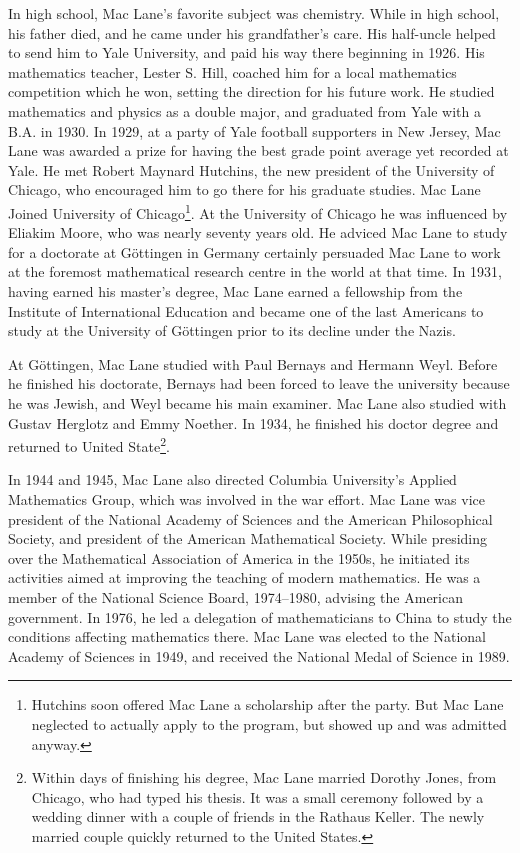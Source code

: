 \documentclass[b5paper]{article}
\begin{document}
In high school, Mac Lane's favorite subject was chemistry. While in high school, his father died, and he came under his grandfather's care. His half-uncle helped to send him to Yale University, and paid his way there beginning in 1926. His mathematics teacher, Lester S. Hill, coached him for a local mathematics competition which he won, setting the direction for his future work. He studied mathematics and physics as a double major, and graduated from Yale with a B.A. in 1930. In 1929, at a party of Yale football supporters in New Jersey, Mac Lane was awarded a prize for having the best grade point average yet recorded at Yale. He met Robert Maynard Hutchins, the new president of the University of Chicago, who encouraged him to go there for his graduate studies\cite{Wiki-Mac-Lane}. Mac Lane Joined University of Chicago\footnote{Hutchins soon offered Mac Lane a scholarship after the party. But Mac Lane neglected to actually apply to the program, but showed up and was admitted anyway.}. At the University of Chicago he was influenced by Eliakim Moore, who was nearly seventy years old. He adviced Mac Lane to study for a doctorate at Göttingen in Germany certainly persuaded Mac Lane to work at the foremost mathematical research centre in the world at that time. In 1931, having earned his master's degree, Mac Lane earned a fellowship from the Institute of International Education and became one of the last Americans to study at the University of Göttingen prior to its decline under the Nazis.

At Göttingen, Mac Lane studied with Paul Bernays and Hermann Weyl. Before he finished his doctorate, Bernays had been forced to leave the university because he was Jewish, and Weyl became his main examiner. Mac Lane also studied with Gustav Herglotz and Emmy Noether. In 1934, he finished his doctor degree and returned to United State\footnote{Within days of finishing his degree, Mac Lane married Dorothy Jones, from Chicago, who had typed his thesis. It was a small ceremony followed by a wedding dinner with a couple of friends in the Rathaus Keller. The newly married couple quickly returned to the United States.}.

In 1944 and 1945, Mac Lane also directed Columbia University's Applied Mathematics Group, which was involved in the war effort. Mac Lane was vice president of the National Academy of Sciences and the American Philosophical Society, and president of the American Mathematical Society. While presiding over the Mathematical Association of America in the 1950s, he initiated its activities aimed at improving the teaching of modern mathematics. He was a member of the National Science Board, 1974–1980, advising the American government. In 1976, he led a delegation of mathematicians to China to study the conditions affecting mathematics there. Mac Lane was elected to the National Academy of Sciences in 1949, and received the National Medal of Science in 1989.
\end{document}
